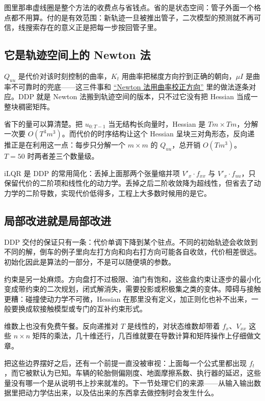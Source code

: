 图里那串虚线圈是整个方法的收费点与省钱点。省的是状态空间：管子外面一个格点都不用算。付的是有效范围：新轨迹一旦被推出管子，二次模型的预测就不再可信，线搜索存在的意义正是把每一步按回管子里。

\subsection{它是轨迹空间上的 Newton 法}

\(Q_{uu}\) 是代价对该时刻控制的曲率，\(K_t\) 用曲率把梯度方向拧到正确的朝向，\(\mu I\) 是曲率不可靠时的兜底——这三件事和 \hyperref[sec:09-Convex-Optimization/06-Optimization-Algorithms/02]{``Newton 法用曲率校正方向''} 里的做法逐条对应。DDP 就是 Newton 法搬到轨迹空间的版本，只不过它没有把 Hessian 当成一整块稠密矩阵。

省下的量可以算清楚。把 \(u_{0:T-1}\) 当无结构长向量时，Hessian 是 \(Tm\times Tm\)，分解一次要 \(O(T^3m^3)\)。而代价的时序结构让这个 Hessian 呈块三对角形态，反向递推正是在利用这一点：每步只分解一个 \(m\times m\) 的 \(Q_{uu}\)，总开销 \(O(Tm^3)\)。\(T=50\) 时两者差三个数量级。

iLQR 是 DDP 的常用简化：丢掉上面那两个张量缩并项 \(V'_x\cdot f_{xx}\) 与 \(V'_x\cdot f_{uu}\)，只保留代价的二阶项和线性化的动力学。丢掉之后二阶收敛降为超线性，但省去了动力学的二阶导数，实现代价低得多，工程上大多数时候用的是它。

\subsection{局部改进就是局部改进}

DDP 交付的保证只有一条：代价单调下降到某个驻点。不同的初始轨迹会收敛到不同的解，倒车的例子里向左打方向和向右打方向可能各自收敛，代价相差很远。初始化因此是算法的一部分，不是可以随便填的参数。

约束是另一处麻烦。方向盘打不过极限、油门有饱和，这些盒约束让逐步的最小化变成带约束的二次规划，闭式解消失，需要投影或积极集之类的变体。障碍与接触更糟：碰撞使动力学不可微，Hessian 在那里没有定义，加正则化也补不出来，一般要换成软接触模型或专门的互补约束形式。

维数上也没有免费午餐。反向递推对 \(T\) 是线性的，对状态维数却带着 \(f_x\)、\(V_{xx}\) 这些 \(n\times n\) 矩阵的乘法，几十维还行，几百维就要在导数计算和矩阵操作上仔细做文章。

把这些边界摆好之后，还有一个前提一直没被审视：上面每一个公式里都出现 \(f_t\)，而它被默认为已知。车辆的轮胎侧偏刚度、地面摩擦系数、执行器的延迟，这些量没有哪一个是从说明书上抄来就准的。下一节处理它们的来源——从输入输出数据里把动力学估出来，以及估出来的东西拿去做控制时会发生什么。
